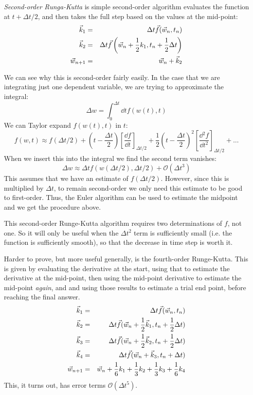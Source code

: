 {\it Second-order Runga-Kutta} is simple second-order algorithm
evaluates the function at $t+\Delta t /2$, and then takes the full
step based on the values at the mid-point:
\begin{eqnarray}
\vec{k}_1 &=& \Delta t \vec{f}(\vec{w}_n, t_n) \cr
\vec{k}_2 &=& \Delta t \vec{f}\left(\vec{w}_n + \frac{1}{2} k_1,
t_n + \frac{1}{2}\Delta t\right) \cr
\vec{w}_{n+1} &=& \vec{w}_n + \vec{k}_2
\end{eqnarray}

We can see why this is second-order fairly easily. In the case that we
are integrating just one dependent variable, we are trying to
approximate the integral:
\begin{equation}
\Delta w = \int_0^{\Delta t} \dd{t} f(w(t), t)
\end{equation}
We can Taylor expand $f(w(t), t)$ in $t$:
\begin{equation}
  f(w, t) \approx f\left(\Delta t /2\right) +
  \left(t - \frac{\Delta t}{2}\right) \left[\frac{\dd{f}}{\dd{t}}\right]_{\Delta t /2} + 
  \frac{1}{2} \left(t - \frac{\Delta t}{2}\right)^2
  \left[\frac{\dd{^2f}}{\dd{t}^2}\right]_{\Delta t /2}   + \ldots
\end{equation}
When we insert this into the integral we find the second term vanishes:
\begin{equation}
\Delta w \approx \Delta t f(w(\Delta t /2), \Delta t /2) +
\mathcal{O}(\Delta t^3)
\end{equation}
This assumes that we have an estimate of $f(\Delta t /2)$.  However,
since this is multiplied by $\Delta t$, to remain second-order we only
need this estimate to be good to first-order. Thus, the Euler
algorithm can be used to estimate the midpoint and we get the
procedure above.

This second-order Runge-Kutta algorithm requires two determinations of
$f$, not one. So it will only be useful when the $\Delta t^2$ term is
sufficiently small (i.e. the function is sufficiently smooth), so that
the decrease in time step is worth it.  

Harder to prove, but more useful generally, is the fourth-order
Runge-Kutta. This is given by evaluating the derivative at the start,
using that to estimate the derivative at the mid-point, then using the
mid-point derivative to estimate the mid-point {\it again}, and and
using those results to estimate a trial end point, before reaching the
final answer.
\begin{eqnarray}
\vec{k}_1 &=& \Delta t \vec{f}(\vec{w}_n, t_n) \cr
\vec{k}_2 &=& \Delta t \vec{f}(\vec{w}_n + \frac{1}{2} \vec{k}_1, t_n +
\frac{1}{2} \Delta t) \cr
\vec{k}_3 &=& \Delta t \vec{f}(\vec{w}_n + \frac{1}{2} \vec{k}_2, t_n +
\frac{1}{2} \Delta t) \cr
\vec{k}_4 &=& \Delta t \vec{f}(\vec{w}_n + \vec{k}_3, t_n + \Delta t) \cr
\vec{w}_{n+1}  &=& \vec{w}_n + \frac{1}{6} k_1
+ \frac{1}{3} k_2 + \frac{1}{3} k_3 + \frac{1}{6} k_4
\end{eqnarray}
This, it turns out, has error terms $\mathcal{O}(\Delta t^5)$. 

